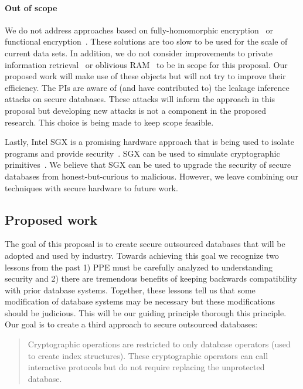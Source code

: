 \paragraph{Out of scope} We do not address approaches based on fully-homomorphic encryption~\cite{STOC:Gentry09} or functional encryption~\cite{FOCS:GGHRSW13}.  These solutions are too slow to be used for the scale of current data sets.  In addition, we do not consider improvements to private information retrieval~\cite{FOCS:CGKS95} or oblivious RAM~\cite{STOC:Goldreich87,goldreich1996software} to be in scope for this proposal.  Our proposed work will make use of these objects but will not try to improve their efficiency.  The PIs are aware of (and have contributed to) the leakage inference attacks on secure databases.  These attacks will inform the approach in this proposal but developing new attacks is not a component in the proposed research.  This choice is being made to keep scope feasible.

Lastly, Intel SGX is a promising hardware approach that is being used to isolate programs and provide security~\cite{EPRINT:CosDev16}.  SGX can be used to simulate cryptographic primitives~\cite{EPRINT:SasGorFle17,EPRINT:FVBG16}.  We believe that SGX can be used to upgrade the security of secure databases from honest-but-curious to malicious.  However, we leave combining our techniques with secure hardware to future work.


\subsection{Proposed work}
The goal of this proposal is to create secure outsourced databases that will be adopted and used by industry.  Towards achieving this goal we recognize two lessons from the past 1) PPE must be carefully analyzed to understanding security and 2) there are tremendous benefits of keeping backwards compatibility with prior database systems.  Together, these lessons tell us that some modification of database systems may be necessary but these modifications should be judicious.  This will be our guiding principle thorough this principle.  Our goal is to create a third approach to secure outsourced databases: 
\begin{quote}Cryptographic operations are restricted to only database operators (used to create index structures).  These cryptographic operators can call interactive protocols but do not require replacing the unprotected database. 
\end{quote}

